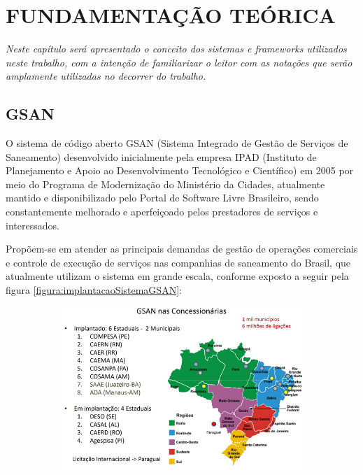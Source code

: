 \chapter[Fundamentação Teórica]{\textbf{\uppercase{Fundamentação Teórica}}}


\textit{Neste capítulo será apresentado o conceito dos sistemas e \textit{frameworks} utilizados neste trabalho, com a intenção de familiarizar o leitor com as notações que serão amplamente utilizadas no decorrer do trabalho.}

\section{GSAN}
O sistema de código aberto GSAN\label{key:GSAN-TEORIA} (Sistema Integrado de Gestão de Serviços de Saneamento) desenvolvido inicialmente pela empresa IPAD (Instituto de Planejamento e Apoio ao Desenvolvimento Tecnológico e Científico) em 2005 por meio do Programa de Modernização do Ministério da Cidades, atualmente mantido e disponibilizado pelo Portal de Software Livre Brasileiro, sendo constantemente melhorado e aperfeiçoado pelos prestadores de serviços e interessados. 

Propõem-se em atender as principais demandas de gestão de operações comerciais e controle de execução de serviços nas companhias de saneamento do Brasil, que atualmente utilizam o sistema em grande escala, conforme exposto a seguir pela figura \ref{figura:implantacaoSistemaGSAN}:


\begin{figure}[H]
	\centering
	\caption{Implantações do Sistema GSAN}	
	\label{figura:implantacaoSistemaGSAN}
	\begin{subfigure}[H]{\textwidth}
		\centering
		\includegraphics{figuras/implantacaoGSAN.png}
	\end{subfigure}
\end{figure}


